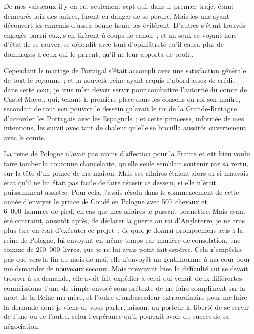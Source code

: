 \documentclass[french,twoside]{book} %
\begin{document}
De mes vaisseaux il y en eut seulement sept qui, dans le premier trajet étant demeurés loin des autres, furent en danger de se perdre. Mais les uns ayant découvert les ennemis d’assez bonne heure les évitèrent. D’autres s’étant trouvés engagés parmi eux, s’en tirèrent à coups de canon ; et un seul, se voyant hors d’état de se sauver, se défendit avec tant d’opiniâtreté qu’il causa plus de dommages à ceux qui le prirent, qu’il ne leur apporta de profit.\par
Cependant le mariage de Portugal s’était accompli avec une satisfaction générale de tout le royaume ; et la nouvelle reine ayant acquis d’abord assez de crédit dans cette cour, je crus m’en devoir servir pour combattre l’autorité du comte de Castel Mayor, qui, tenant la première place dans les conseils du roi son maître, secondait de tout son pouvoir le dessein qu’avait le roi de la Grande-Bretagne d’accorder les Portugais avec les Espagnols ; et cette princesse, informée de mes intentions, les suivit avec tant de chaleur qu’elle se brouilla aussitôt ouvertement avec le comte.\par
La reine de Pologne n’avait pas moins d’affection pour la France et eût bien voulu faire tomber la couronne chancelante, qu’elle seule semblait soutenir par sa vertu, sur la tête d’un prince de ma maison. Mais ses affaires étaient alors en si mauvais état qu’il ne lui était pas facile de faire réussir ce dessein, si elle n’était puissamment assistée. Pour cela, j’avais résolu dans le commencement de cette année d’envoyer le prince de Condé en Pologne avec 500 chevaux et 6 000 hommes de pied, en cas que mes affaires le pussent permettre. Mais ayant été contraint, aussitôt après, de déclarer la guerre au roi d’Angleterre, je ne crus plus être en état d’exécuter ce projet : de quoi je donnai promptement avis à la reine de Pologne, lui envoyant en même temps par manière de consolation, une somme de 200 000 livres, que je ne lui avais point fait espérer. Cela n’empêcha pas que vers la fin du mois de mai, elle n’envoyât un gentilhomme à ma cour pour me demander de nouveaux secours. Mais prévoyant bien la difficulté qui se devait trouver à sa demande, elle avait fait expédier à celui qui venait deux différentes commissions, l’une de simple envoyé sous prétexte de me faire compliment sur la mort de la Reine ma mère, et l’autre d’ambassadeur extraordinaire pour me faire la demande dont je viens de vous parler, laissant au porteur la liberté de se servir de l’une ou de l’autre, selon l’espérance qu’il pourrait avoir du succès de sa négociation.\par
\end{document}
